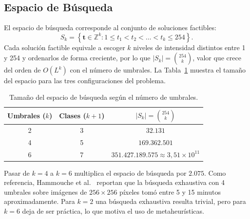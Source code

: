 \documentclass[letter, 10pt]{article}
\begin{document}
\subsection{Espacio de B\'usqueda}
El espacio de b\'usqueda corresponde al conjunto de soluciones factibles:
\begin{equation}
    S_k = \left\{ \mathbf{t} \in \mathbb{Z}^k : 1 \leq t_1 < t_2 < \dots < t_k \leq 254 \right\}.
\end{equation}
Cada soluci\'on factible equivale a escoger $k$ niveles de intensidad distintos entre 1 y 254 y ordenarlos de forma creciente, por lo que $|S_k| = \binom{254}{k}$, valor que crece del orden de $O(L^k)$ con el n\'umero de umbrales. La Tabla~\ref{tab:espacio} muestra el tama\~no del espacio para las tres configuraciones del problema.

\begin{table}[h]
    \centering
    \begin{tabular}{ccc}
        \hline
        Umbrales ($k$) & Clases ($k+1$) & $|S_k| = \binom{254}{k}$ \\
        \hline
        2 & 3 & $32.131$ \\
        4 & 5 & $169.362.501$ \\
        6 & 7 & $351.427.189.575 \approx 3{,}51 \times 10^{11}$ \\
        \hline
    \end{tabular}
    \caption{Tama\~no del espacio de b\'usqueda seg\'un el n\'umero de umbrales.}
    \label{tab:espacio}
\end{table}

Pasar de $k = 4$ a $k = 6$ multiplica el espacio de b\'usqueda por $2.075$. Como referencia, Hammouche et al.~\cite{Hammouche2010Comparative} reportan que la b\'usqueda exhaustiva con 4 umbrales sobre im\'agenes de $256 \times 256$ p\'ixeles tom\'o entre 5 y 15 minutos aproximadamente. Para $k = 2$ una b\'usqueda exhaustiva resulta trivial, pero para $k = 6$ deja de ser pr\'actica, lo que motiva el uso de metaheur\'isticas.
\end{document}

